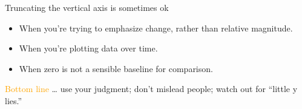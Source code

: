 \documentclass[
  ignorenonframetext,
]{beamer}
\providecommand{\tightlist}{%
  \setlength{\itemsep}{0pt}\setlength{\parskip}{0pt}}
\begin{document}
\begin{frame}{}
\label{section-6}
\end{frame}

\begin{frame}{}
\label{section-7}
\end{frame}

\begin{frame}{Truncating the vertical axis is sometimes ok}
\label{truncating-the-vertical-axis-is-sometimes-ok}
\begin{itemize}
\tightlist
\item
  When you're trying to emphasize change, rather than relative
  magnitude.
\item
  When you're plotting data over time.
\item
  When zero is not a sensible baseline for comparison.
\end{itemize}

\textcolor{orange}{Bottom line} \ldots{} use your judgment; don't
mislead people; watch out for ``little y lies.''
\end{frame}
\end{document}
